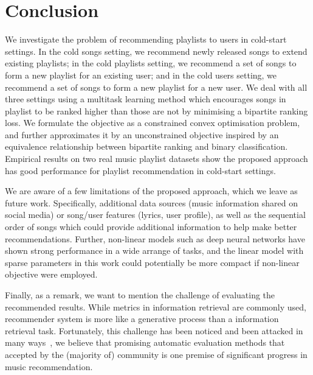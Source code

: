 \section{Conclusion}

We investigate the problem of recommending playlists to users in cold-start settings.
In the cold songs setting, we recommend newly released songs to extend existing playlists;
in the cold playlists setting, we recommend a set of songs to form a new playlist for an existing user;
and in the cold users setting, we recommend a set of songs to form a new playlist for a new user.
We deal with all three settings using a multitask learning method which encourages songs in playlist 
to be ranked higher than those are not by minimising a bipartite ranking loss. 
We formulate the objective as a constrained convex optimisation problem, and further approximates it 
by an unconstrained objective inspired by an equivalence relationship between bipartite ranking and
binary classification. 
Empirical results on two real music playlist datasets show the proposed approach 
has good performance for playlist recommendation in cold-start settings.

We are aware of a few limitations of the proposed approach, which we leave as future work.
Specifically, additional data sources (\eg music information shared on social media) or song/user 
features (\eg lyrics, user profile), as well as the sequential order of songs which could provide 
additional information to help make better recommendations.
Further, non-linear models such as deep neural networks have shown strong performance in a wide arrange of tasks,
and the linear model with sparse parameters in this work could potentially be more compact if non-linear objective were employed.

Finally, as a remark, we want to mention the challenge of evaluating the recommended results.
While metrics in information retrieval are commonly used, recommender system is more like a generative process
than a information retrieval task. Fortunately, this challenge has been noticed and been attacked in many 
ways~\cite{mcfee2011natural,mcfee2012hypergraph,schedl2017}, 
we believe that promising automatic evaluation methods that accepted by the (majority of) 
community is one premise of significant progress in music recommendation.
